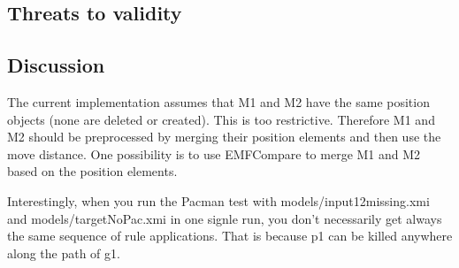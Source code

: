 \subsection{Threats to validity}

\subsection{Discussion}
The current implementation assumes that M1 and M2 have the same position objects (none are deleted or created). This is too restrictive. Therefore M1 and M2 should be preprocessed by merging their position elements and then use the move distance. One possibility is to use EMFCompare to merge M1 and M2 based on the position elements.

Interestingly, when you run the Pacman test with models/input12missing.xmi and models/targetNoPac.xmi in one signle run, you don't necessarily get always the same sequence of rule applications. That is because p1 can be killed anywhere along the path of g1. 